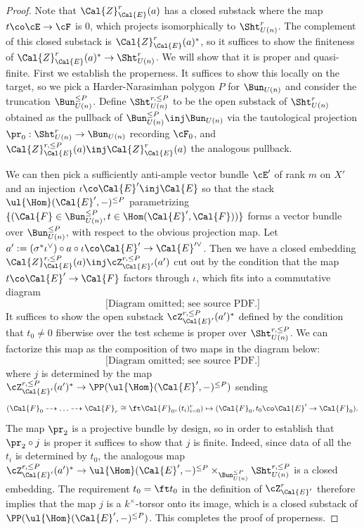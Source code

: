 \begin{proof}
Note that $\Cal{Z}_{\Cal{E}}^{r}(a)$ has a closed substack where the map $t \co \cE \rightarrow \cF$ is $0$, which projects isomorphically to $\Sht_{U(n)}^r$. The complement of this closed substack is $\Cal{Z}_{\Cal{E}}^{r}(a)^*$, so it suffices to show the finiteness of $\Cal{Z}_{\Cal{E}}^{r}(a)^* \rightarrow \Sht_{U(n)}^{r}$. We will show that it is proper and quasi-finite. First we establish the properness. It suffices to show this locally on the target, so we pick a Harder-Narasimhan polygon $P$ for $\Bun_{U(n)}$ and consider the truncation $\Bun_{U(n)}^{\leq P}$. Define $\Sht_{U(n)}^{r, \leq P} $ to be the open substack of $\Sht_{U(n)}^r$ obtained as the pullback of $\Bun_{U(n)}^{\leq P} \inj \Bun_{U(n)}$ via the tautological projection $\pr_{0}: \Sht_{U(n)}^r \rightarrow \Bun_{U(n)}$ recording $\cF_{0}$, and $\Cal{Z}_{\Cal{E}}^{r, \leq P}(a) \inj \Cal{Z}_{\Cal{E}}^{r}(a)$ the analogous pullback.

We can then pick a sufficiently anti-ample vector bundle $\cE'$ of rank $m$ on $X'$ and an injection $\iota \co \Cal{E}' \inj \Cal{E} $ so that the stack $\ul{\Hom}(\Cal{E}', -)^{\leq P}$ parametrizing $\{(\Cal{F} \in \Bun_{U(n)}^{\leq P}, t \in \Hom(\Cal{E}', \Cal{F}))\}$ forms a vector bundle over $\Bun_{U(n)}^{\leq P}$, with respect to the obvious projection map. Let $a' := (\sigma^{*} \iota^{\vee}) \circ a \circ \iota \co \Cal{E}' \rightarrow \Cal{E}'^\vee$.  Then we have a closed embedding $\Cal{Z}_{\Cal{E}}^{r, \leq P}(a)  \inj \cZ_{\Cal{E}'}^{r, \leq P}(a')$ cut out by the condition that the map $t \co \Cal{E}' \rightarrow \Cal{F}$ factors through $\iota$, which fits into a commutative diagram
\[
\text{[Diagram omitted; see source PDF.]}
\]
It suffices to show the open substack $\cZ_{\Cal{E}'}^{r, \leq P}(a')^*$ defined by the condition that  $t_{0}\ne0$ fiberwise over the test scheme is proper over $ \Sht_{U(n)}^{r, \leq P} $. We can factorize this map as the composition of two maps in the diagram below:
\[
\text{[Diagram omitted; see source PDF.]}
\]
where $j$ is determined by the map $\cZ_{\Cal{E}'}^{r, \leq P}(a')^* \rightarrow \PP(\ul{\Hom}(\Cal{E}', -)^{\leq P})$ sending
\[
(\Cal{F}_0 \dashrightarrow \ldots \dashrightarrow \Cal{F}_r \cong \ft \Cal{F}_0, (t_i)_{i=0}^r) \mapsto (\Cal{F}_0 , t_0 \co \Cal{E}' \rightarrow \Cal{F}_0).
\]
The map $\pr_2$ is a projective bundle by design, so in order to establish that $\pr_2 \circ j$ is proper it suffices to show that $j$ is finite. Indeed, since data of all the $t_i$ is determined by $t_0$, the analogous map $\cZ_{\Cal{E}'}^{r, \leq P}(a')^*  \rightarrow \ul{\Hom}(\Cal{E}', -)^{\leq P} \times_{\Bun_{U(n)}^{\leq P}} \Sht_{U(n)}^{r, \leq P}$ is a closed embedding. The requirement $t_0 = \ft t_0$ in the definition of $\cZ_{\Cal{E}'}^{r}$ therefore implies that the map $j$ is a $k^{\times}$-torsor onto its image, which is a closed substack of $\PP(\ul{\Hom}(\Cal{E}', -)^{\leq P})$. This completes the proof of properness.


\end{proof}
